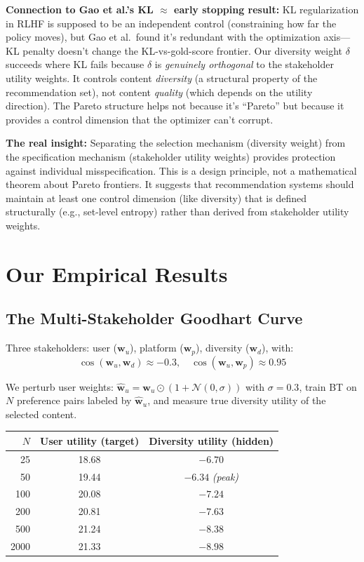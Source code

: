 \documentclass[11pt]{article}
\begin{document}
\textbf{Connection to Gao et al.'s KL $\approx$ early stopping
result:} KL regularization in RLHF is supposed to be an independent
control (constraining how far the policy moves), but Gao et al.\ found
it's redundant with the optimization axis---KL penalty doesn't change
the KL-vs-gold-score frontier. Our diversity weight $\delta$ succeeds
where KL fails because $\delta$ is \emph{genuinely orthogonal} to the
stakeholder utility weights. It controls content \emph{diversity} (a
structural property of the recommendation set), not content
\emph{quality} (which depends on the utility direction). The Pareto
structure helps not because it's ``Pareto'' but because it provides a
control dimension that the optimizer can't corrupt.

\textbf{The real insight:} Separating the selection mechanism
(diversity weight) from the specification mechanism (stakeholder
utility weights) provides protection against individual
misspecification. This is a design principle, not a mathematical
theorem about Pareto frontiers. It suggests that recommendation
systems should maintain at least one control dimension (like diversity)
that is defined structurally (e.g., set-level entropy) rather than
derived from stakeholder utility weights.

\section{Our Empirical Results}

\subsection{The Multi-Stakeholder Goodhart Curve}

Three stakeholders: user ($\mathbf{w}_u$), platform ($\mathbf{w}_p$),
diversity ($\mathbf{w}_d$), with:
\begin{equation}
  \cos(\mathbf{w}_u, \mathbf{w}_d) \approx -0.3, \quad
  \cos(\mathbf{w}_u, \mathbf{w}_p) \approx 0.95
\end{equation}

We perturb user weights: $\hat{\mathbf{w}}_u = \mathbf{w}_u \odot
(1 + \mathcal{N}(0, \sigma))$ with $\sigma = 0.3$, train BT on
$N$ preference pairs labeled by $\hat{\mathbf{w}}_u$, and measure
true diversity utility of the selected content.

\begin{center}
\begin{tabular}{rcc}
\toprule
$N$ & User utility (target) & Diversity utility (hidden) \\
\midrule
25 & 18.68 & $-6.70$ \\
50 & 19.44 & $\mathbf{-6.34}$ \textit{(peak)} \\
100 & 20.08 & $-7.24$ \\
200 & 20.81 & $-7.63$ \\
500 & 21.24 & $-8.38$ \\
2000 & 21.33 & $-8.98$ \\
\bottomrule
\end{tabular}
\end{center}
\end{document}
